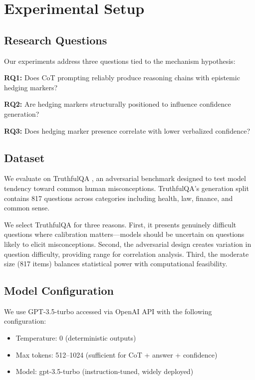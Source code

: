 \section{Experimental Setup}

\subsection{Research Questions}

Our experiments address three questions tied to the mechanism hypothesis:

\textbf{RQ1:} Does CoT prompting reliably produce reasoning chains with epistemic hedging markers?

\textbf{RQ2:} Are hedging markers structurally positioned to influence confidence generation?

\textbf{RQ3:} Does hedging marker presence correlate with lower verbalized confidence?

\subsection{Dataset}

We evaluate on TruthfulQA \citep{lin2022truthfulqa}, an adversarial benchmark designed to test model tendency toward common human misconceptions. TruthfulQA's generation split contains 817 questions across categories including health, law, finance, and common sense.

We select TruthfulQA for three reasons. First, it presents genuinely difficult questions where calibration matters---models should be uncertain on questions likely to elicit misconceptions. Second, the adversarial design creates variation in question difficulty, providing range for correlation analysis. Third, the moderate size (817 items) balances statistical power with computational feasibility.

\subsection{Model Configuration}

We use GPT-3.5-turbo accessed via OpenAI API with the following configuration:
\begin{itemize}
    \item Temperature: 0 (deterministic outputs)
    \item Max tokens: 512--1024 (sufficient for CoT + answer + confidence)
    \item Model: gpt-3.5-turbo (instruction-tuned, widely deployed)
\end{itemize}

